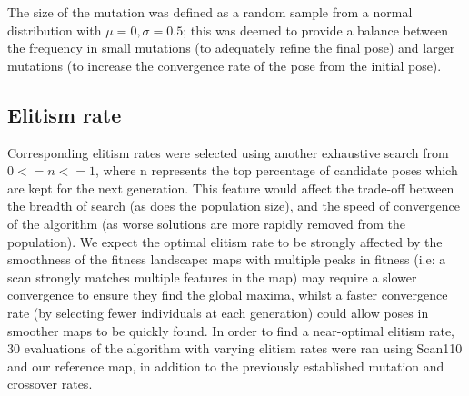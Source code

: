 \documentclass[authoryearcitations]{UoYCSproject}
\begin{document}
The size of the mutation was defined as a random sample from a normal distribution with $\mu=0, \sigma=0.5$; this was deemed to provide a balance between the frequency in small mutations (to adequately refine the final pose) and larger mutations (to increase the convergence rate of the pose from the initial pose).

\subsection{Elitism rate}
\label{subsec:elite_elitism_rate}
Corresponding elitism rates were selected using another exhaustive search from $0 <= n <= 1$, where n represents the top percentage of candidate poses which are kept for the next generation. This feature would affect the trade-off between the breadth of search (as does the population size), and the speed of convergence of the algorithm (as worse solutions are more rapidly removed from the population). We expect the optimal elitism rate to be strongly affected by the smoothness of the fitness landscape: maps with multiple peaks in fitness (i.e: a scan strongly matches multiple features in the map) may require a slower convergence to ensure they find the global maxima, whilst a faster convergence rate (by selecting fewer individuals at each generation) could allow poses in smoother maps to be quickly found. In order to find a near-optimal elitism rate, 30 evaluations of the algorithm with varying elitism rates were ran using Scan110 and our reference map, in addition to the previously established mutation and crossover rates.
\end{document}
